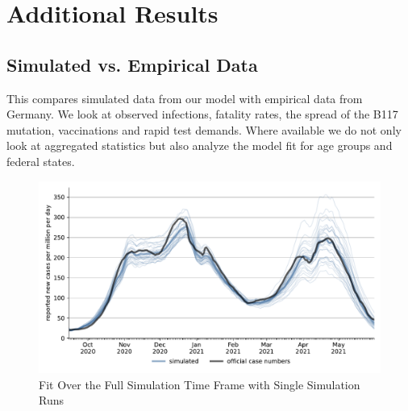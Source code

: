 \section{Additional Results}
\label{sec:additional_results}

\subsection{Simulated vs. Empirical Data}
\label{subsec:fit_results}

This compares simulated data from our model with empirical data from Germany. We look at
observed infections, fatality rates, the spread of the B117 mutation, vaccinations and
rapid test demands. Where available we do not only look at aggregated statistics but also
analyze the model fit for age groups and federal states.


\begin{figure}[ht]
  \centering
  \includegraphics[width=\textwidth]{figures/results/figures/scenario_comparisons/combined_fit/full_new_known_case_with_single_runs}
  \caption{Fit Over the Full Simulation Time Frame with Single Simulation Runs}
  \label{fig:aggregated_fit2}
\end{figure}

